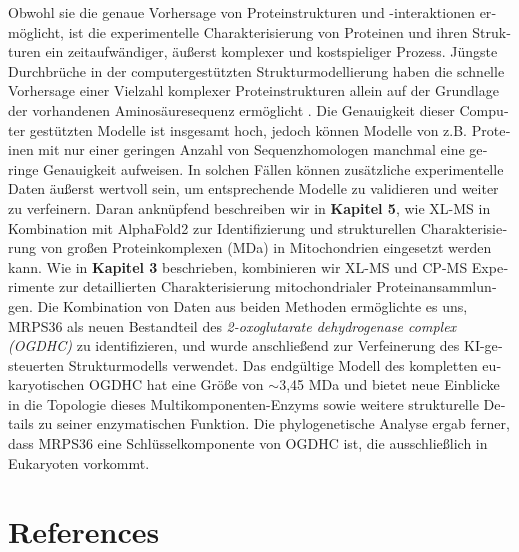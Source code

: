 \begin{otherlanguage}{german}
    Obwohl sie die genaue Vorhersage von Proteinstrukturen und -interaktionen ermöglicht, ist die experimentelle Charakterisierung von Proteinen und ihren Strukturen ein zeit\-aufwändiger, äußerst komplexer und kostspieliger Prozess. Jüngste Durchbrüche in der computergestützten Strukturmodellierung haben die schnelle Vorhersage einer Vielzahl komplexer Proteinstrukturen allein auf der Grundlage der vorhandenen Amino\-säuresequenz ermöglicht \cite{RN5, RN4}. Die Genauigkeit dieser Computer gestützten Modelle ist insgesamt hoch, jedoch können Modelle von z.B. Proteinen mit nur einer geringen Anzahl von Sequenzhomologen manchmal eine geringe Genauigkeit aufweisen. In solchen Fällen können zusätzliche experimentelle Daten äußerst wertvoll sein, um entsprechende Modelle zu validieren und weiter zu verfeinern. Daran anknüpfend beschreiben wir in \textbf{Kapitel 5}, wie XL-MS in Kombination mit AlphaFold2 \cite{RN4} zur Identifizierung und strukturellen Charakterisierung von großen Proteinkomplexen (MDa) in Mitochondrien eingesetzt werden kann. Wie in \textbf{Kapitel 3} beschrieben, kombinieren wir XL-MS und CP-MS Experimente zur detaillierten Charakterisierung mitochondrialer Proteinansammlungen. Die Kombination von Daten aus beiden Methoden ermöglichte es uns, MRPS36 als neuen Bestandteil des \emph{2-oxoglutarate dehydrogenase complex (OGDHC)} zu identifizieren, und wurde anschließend zur Verfeinerung des KI-gesteuerten Strukturmodells verwendet. Das endgültige Modell des kompletten eukaryotischen OGDHC hat eine Größe von $\sim$3,45 MDa und bietet neue Einblicke in die Topologie dieses Multikomponenten-Enzyms sowie weitere strukturelle Details zu seiner enzymatischen Funktion. Die phylogenetische Analyse ergab ferner, dass MRPS36 eine Schlüsselkomponente von OGDHC ist, die ausschließlich in Eukaryoten vorkommt.
\end{otherlanguage}
\clearpage
\section*{References}


